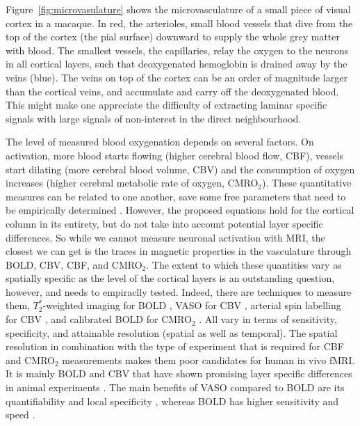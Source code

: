 Figure~\ref{fig:microvasulature} shows the microvasculature of a small piece of visual cortex in a macaque. In red, the arterioles, small blood vessels that dive from the top of the cortex (the pial surface) downward to supply the whole grey matter with blood. The smallest vessels, the capillaries, relay the oxygen to the neurons in all cortical layers, such that deoxygenated hemoglobin is drained away by the veins (blue). The veins on top of the cortex can be an order of magnitude larger than the cortical veins, and accumulate and carry off the deoxygenated blood. This might make one appreciate the difficulty of extracting laminar specific signals with large signals of non-interest in the direct neighbourhood.


The level of measured blood oxygenation depends on several factors. On activation, more blood starts flowing (higher cerebral blood flow, CBF), vessels start dilating (more cerebral blood volume, CBV) and the consumption of oxygen increases (higher cerebral metabolic rate of oxygen, CMRO$_{2}$). These quantitative measures can be related to one another, save some free parameters that need to be empirically determined \cite{Davis1997}. However, the proposed equations hold for the cortical column in its entirety, but do not take into account potential layer specific differences. So while we cannot measure neuronal activation with MRI, the closest we can get is the traces in magnetic properties in the vasculature through BOLD, CBV, CBF, and CMRO$_{2}$. The extent to which these quantities vary as spatially specific as the level of the cortical layers is an outstanding question, however, and needs to empiraclly tested. Indeed, there are techniques to measure them, $T_2^*$-weighted imaging for BOLD \cite{Norris2006}, VASO for CBV \cite{Huber2018}, arterial spin labelling for CBV \cite{Grade2015}, and calibrated BOLD for CMRO$_{2}$ \cite{Blockley2013}. All vary in terms of sensitivity, specificity, and attainable resolution (spatial as well as temporal). The spatial resolution in combination with the type of experiment that is required for CBF and CMRO$_2$ measurements makes them poor candidates for human in vivo fMRI. It is mainly BOLD and CBV that have shown promising layer specific differences in animal experiments \cite{Lu2004,Zhao2006,Jin2008,Goense2012}. The main benefits of VASO compared to BOLD are its quantifiability \cite{Lu2003} and local specificity \cite{Jin2006}, whereas BOLD has higher sensitivity and speed \cite{Huber2018}.

